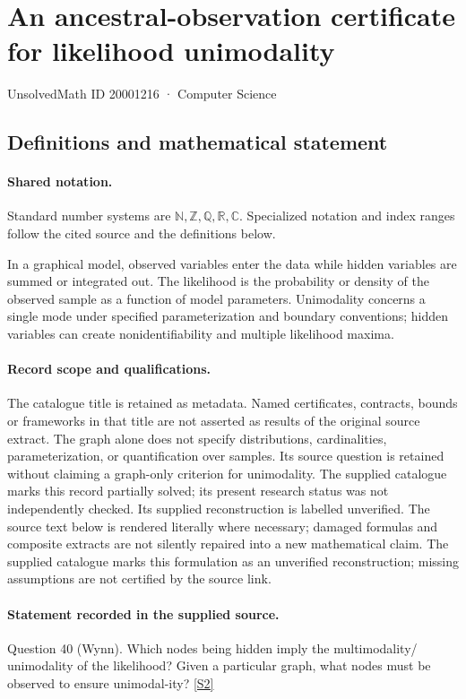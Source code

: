 \documentclass[11pt]{article}
\newcommand{\sref}[2]{\hyperlink{source:#1:#2}{[S#2]}}
\begin{document}
\setcounter{section}{20001215}
\section{An ancestral-observation certificate for likelihood unimodality}\label{20001216}
{\small\sffamily UnsolvedMath ID 20001216 · Computer Science}
\subsection{Definitions and mathematical statement}

\paragraph{Shared notation.}Standard number systems are $\mathbb N,\mathbb Z,\mathbb Q,\mathbb R,\mathbb C$. Specialized notation and index ranges follow the cited source and the definitions below.


In a graphical model, observed variables enter the data while hidden variables are summed or integrated out. The likelihood is the probability or density of the observed sample as a function of model parameters. Unimodality concerns a single mode under specified parameterization and boundary conventions; hidden variables can create nonidentifiability and multiple likelihood maxima.
\paragraph{Record scope and qualifications.}
The catalogue title is retained as metadata. Named certificates, contracts, bounds or frameworks in that title are not asserted as results of the original source extract.
The graph alone does not specify distributions, cardinalities, parameterization, or quantification over samples. Its source question is retained without claiming a graph-only criterion for unimodality. The supplied catalogue marks this record partially solved; its present research status was not independently checked. Its supplied reconstruction is labelled unverified.
The source text below is rendered literally where necessary; damaged formulas and composite extracts are not silently repaired into a new mathematical claim.
The supplied catalogue marks this formulation as an unverified reconstruction; missing assumptions are not certified by the source link.
\paragraph{Statement recorded in the supplied source.}
Question 40 (Wynn). Which nodes being hidden imply the multimodality/ unimodality of the likelihood? Given a particular graph, what nodes must be observed to ensure unimodal-ity? \sref{20001216}{2}
\end{document}
